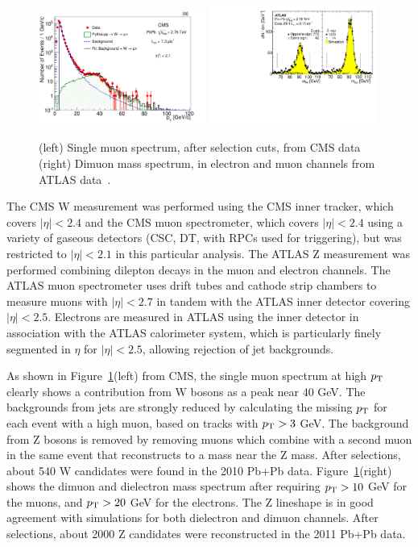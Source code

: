 \begin{figure}[t]
\begin{center}
\includegraphics[width=0.49\textwidth]{electroweak_figs/Fig1a.pdf}
\includegraphics[width=0.49\textwidth]{electroweak_figs/fig_01.pdf}
\caption[]{(left) Single muon spectrum, after selection cuts, from CMS data~\cite{Chatrchyan:2012nt} (right) Dimuon mass spectrum, in electron and muon channels from ATLAS data~\cite{Aad:2012ew}.}
\label{fig:pas:zw_signal}
\end{center}
\end{figure}
The CMS W measurement was performed using the CMS inner tracker, which covers $|\eta|<2.4$ 
and the CMS muon spectrometer, which covers $|\eta|<2.4$ using a variety of gaseous detectors
(CSC, DT, with RPCs used for triggering), but was restricted to $|\eta|<2.1$ in this particular analysis.
The ATLAS Z measurement was performed combining dilepton decays in the muon and electron channels.
The ATLAS muon spectrometer uses drift tubes and cathode strip chambers to measure muons with $|\eta|<2.7$
in tandem with the ATLAS inner detector covering $|\eta|<2.5$.
Electrons are measured in ATLAS using the inner detector in association with the ATLAS calorimeter system, 
which is particularly finely segmented in $\eta$ for $|\eta|<2.5$, allowing rejection of jet backgrounds.

As shown in Figure~\ref{fig:pas:zw_signal}(left) from CMS, the single muon spectrum at high $\mbox{$p_{\mathrm{T}}$}$ clearly shows a contribution
from W bosons as a peak near 40 GeV.  
The backgrounds from jets are strongly reduced by calculating the missing $\mbox{$p_{\mathrm{T}}$}$ for each event with a
high \pT muon, based on tracks with $\mbox{$p_{\mathrm{T}}$}>3$ GeV.  The background from Z bosons is removed by removing muons which
combine with a second muon in the same event that reconstructs to a mass near the Z mass.
After selections, about 540 W candidates were found in the 2010 Pb+Pb data.
%
Figure~\ref{fig:pas:zw_signal}(right) shows the dimuon and dielectron mass spectrum after requiring $\mbox{$p_{\mathrm{T}}$}>10$ GeV for
the muons, and $\mbox{$p_{\mathrm{T}}$}>20$ GeV for the electrons.  The Z lineshape is in good agreement with simulations for both
dielectron and dimuon channels.
After selections, about 2000 Z candidates were reconstructed in the 2011 Pb+Pb data.


